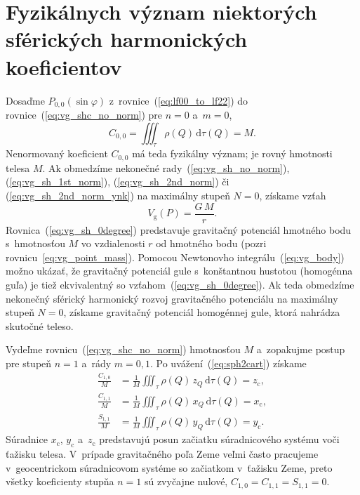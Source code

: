 \documentclass[a4paper, 12pt]{book}
\newcommand{\diff}{\mathrm d}
\newcommand{\gidx}{\mathrm g}
\begin{document}

\section{Fyzikálnych význam niektorých sférických harmonických koeficientov}
\label{sec:physical_meaning_of_spherical_harmonic_coefficients}

Dosaďme $P_{0,0}(\sin\varphi)$ z~rovnice~(\ref{eq:lf00_to_lf22})
do rovnice~(\ref{eq:vg_shc_no_norm}) pre $n = 0$ a~$m = 0$,
%
\begin{equation}
C_{0,0} = \iiint_{\tau} \rho(Q) \, \diff \tau(Q) = M{.}
\end{equation}
%
Nenormovaný koeficient $C_{0,0}$ má teda fyzikálny význam; je rovný hmotnosti
telesa $M$.  Ak obmedzíme nekonečné rady~(\ref{eq:vg_sh_no_norm}),
(\ref{eq:vg_sh_1st_norm}), (\ref{eq:vg_sh_2nd_norm}) či
(\ref{eq:vg_sh_2nd_norm_ynk}) na maximálny stupeň $N = 0$, získame vzťah
%
\begin{equation}
\label{eq:vg_sh_0degree}
V_\gidx(P) = \frac{G \, M}{r}{.}
\end{equation}
%
Rovnica~(\ref{eq:vg_sh_0degree}) predstavuje gravitačný potenciál hmotného bodu
s~hmotnosťou $M$ vo vzdialenosti $r$ od hmotného bodu (pozri
rovnicu~\ref{eq:vg_point_mass}).  Pomocou Newtonovho
integrálu~(\ref{eq:vg_body}) možno ukázať, že gravitačný potenciál gule
s~konštantnou hustotou (homogénna guľa) je tiež ekvivalentný so
vzťahom~(\ref{eq:vg_sh_0degree}).  Ak teda obmedzíme nekonečný sférický
harmonický rozvoj gravitačného potenciálu na maximálny stupeň $N = 0$, získame
gravitačný potenciál homogénnej gule, ktorá nahrádza skutočné teleso.

Vydeľme rovnicu~(\ref{eq:vg_shc_no_norm}) hmotnosťou $M$ a~zopakujme postup pre
stupeň $n = 1$ a~rády $m = 0, 1$.  Po uvážení~(\ref{eq:sph2cart}) získame
%
\begin{equation}
\begin{split}
\frac{C_{1,0}}{M} &= \frac{1}{M} \iiint_{\tau} \rho(Q) \, z_Q \, \diff \tau(Q)
= z_\mathrm{c}{,}\\
\frac{C_{1,1}}{M} &= \frac{1}{M} \iiint_{\tau} \rho(Q) \, x_Q \, \diff \tau(Q)
= x_\mathrm{c}{,}\\
\frac{S_{1,1}}{M} &= \frac{1}{M} \iiint_{\tau} \rho(Q) \, y_Q \, \diff \tau(Q)
= y_\mathrm{c}{.}
\end{split}
\end{equation}
%
Súradnice $x_\mathrm{c}$, $y_\mathrm{c}$ a~$z_\mathrm{c}$ predstavujú posun
začiatku súradnicového systému voči ťažisku telesa.  V~prípade gravitačného
poľa Zeme veľmi často pracujeme v~geocentrickom súradnicovom systéme so
začiatkom v~ťažisku Zeme, preto všetky koeficienty stupňa $n = 1$ sú zvyčajne
nulové, $C_{1,0} = C_{1,1} = S_{1,1} = 0$.
\end{document}
